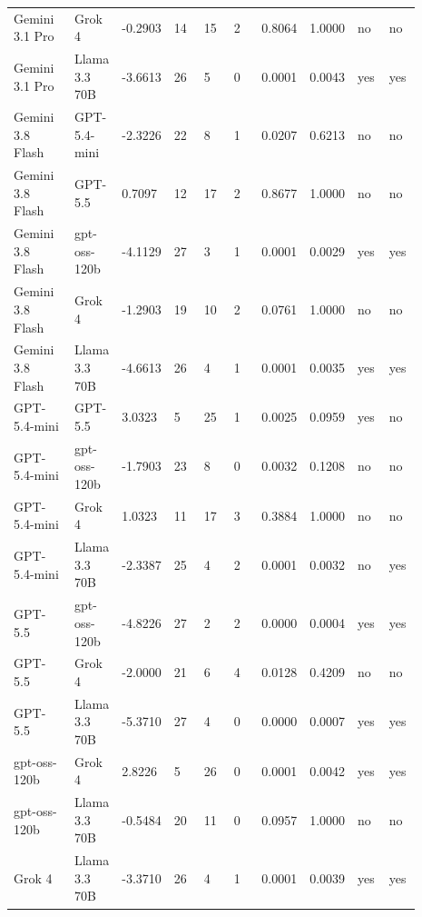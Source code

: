 \begin{landscape}
\begin{longtable}{p{0.162\linewidth}p{0.081\linewidth}p{0.081\linewidth}p{0.081\linewidth}p{0.081\linewidth}p{0.081\linewidth}p{0.081\linewidth}p{0.081\linewidth}p{0.081\linewidth}p{0.081\linewidth}}
Gemini 3.1 Pro & Grok 4 & -0.2903 & 14 & 15 & 2 & 0.8064 & 1.0000 & no & no \\
Gemini 3.1 Pro & Llama 3.3 70B & -3.6613 & 26 & 5 & 0 & 0.0001 & 0.0043 & yes & yes \\
Gemini 3.8 Flash & GPT-5.4-mini & -2.3226 & 22 & 8 & 1 & 0.0207 & 0.6213 & no & no \\
Gemini 3.8 Flash & GPT-5.5 & 0.7097 & 12 & 17 & 2 & 0.8677 & 1.0000 & no & no \\
Gemini 3.8 Flash & gpt-oss-120b & -4.1129 & 27 & 3 & 1 & 0.0001 & 0.0029 & yes & yes \\
Gemini 3.8 Flash & Grok 4 & -1.2903 & 19 & 10 & 2 & 0.0761 & 1.0000 & no & no \\
Gemini 3.8 Flash & Llama 3.3 70B & -4.6613 & 26 & 4 & 1 & 0.0001 & 0.0035 & yes & yes \\
GPT-5.4-mini & GPT-5.5 & 3.0323 & 5 & 25 & 1 & 0.0025 & 0.0959 & yes & no \\
GPT-5.4-mini & gpt-oss-120b & -1.7903 & 23 & 8 & 0 & 0.0032 & 0.1208 & no & no \\
GPT-5.4-mini & Grok 4 & 1.0323 & 11 & 17 & 3 & 0.3884 & 1.0000 & no & no \\
GPT-5.4-mini & Llama 3.3 70B & -2.3387 & 25 & 4 & 2 & 0.0001 & 0.0032 & no & yes \\
GPT-5.5 & gpt-oss-120b & -4.8226 & 27 & 2 & 2 & 0.0000 & 0.0004 & yes & yes \\
GPT-5.5 & Grok 4 & -2.0000 & 21 & 6 & 4 & 0.0128 & 0.4209 & no & no \\
GPT-5.5 & Llama 3.3 70B & -5.3710 & 27 & 4 & 0 & 0.0000 & 0.0007 & yes & yes \\
gpt-oss-120b & Grok 4 & 2.8226 & 5 & 26 & 0 & 0.0001 & 0.0042 & yes & yes \\
gpt-oss-120b & Llama 3.3 70B & -0.5484 & 20 & 11 & 0 & 0.0957 & 1.0000 & no & no \\
Grok 4 & Llama 3.3 70B & -3.3710 & 26 & 4 & 1 & 0.0001 & 0.0039 & yes & yes \\
\bottomrule
\end{longtable}
\normalsize
\end{landscape}
